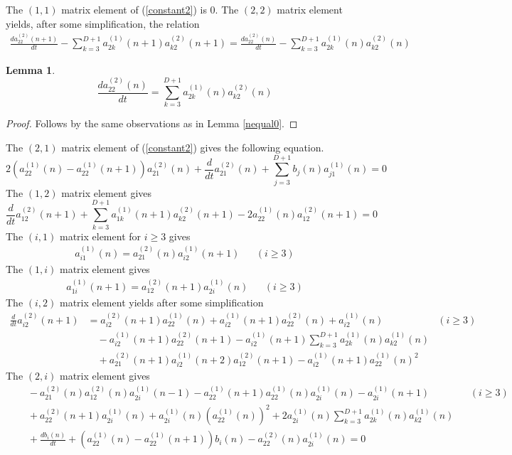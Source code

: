 \documentclass[12pt]{article}
\newtheorem{lemma}[theorem]{Lemma}
\theoremstyle{definition}
\begin{document}
The $(1,1)$ matrix element of (\ref{constant2}) is $0$. The $(2,2)$ matrix element yields, after some simplification, the relation 
\begin{align*}
\frac{da_{22}^{(2)}(n+1)}{dt} - \sum_{k=3}^{D+1} a_{2k}^{(1)}(n+1)a_{k2}^{(2)}(n+1) = \frac{d a_{22}^{(2)}(n)}{dt}  - \sum_{k=3}^{D+1} a_{2k}^{(1)}(n)a_{k2}^{(2)}(n)
\end{align*}
\begin{lemma}
$$\frac{d a_{22}^{(2)}(n)}{dt} = \sum_{k=3}^{D+1} a_{2k}^{(1)}(n)a_{k2}^{(2)}(n)$$
\end{lemma}
\begin{proof}
Follows by the same observations as in Lemma \ref{nequal0}.
\end{proof}
The $(2,1)$ matrix element of (\ref{constant2}) gives the following equation.
\begin{equation}\label{constant21}
 2 (a_{22}^{(1)}(n) - a_{22}^{(1)}(n+1) )a_{21}^{(2)}(n) + \frac{d}{dt} a_{21}^{(2)}(n)
+ \sum_{j=3}^{D+1} b_j(n) a_{j1}^{(1)}(n) = 0
\end{equation}
The $(1,2)$ matrix element gives
\begin{equation}\label{constant12}
  \frac{d}{dt} a_{12}^{(2)}(n+1)+\sum_{k=3}^{D+1} a_{1k}^{(1)}(n+1)a_{k2}^{(2)}(n+1) - 2 a_{22}^{(1)}(n) a_{12}^{(2)}(n+1)   = 0
\end{equation}
The $(i,1)$ matrix element for $i\geq 3$ gives
\begin{align}\label{identity3}
a_{i1}^{(1)}(n) = a_{21}^{(2)}(n) a_{i2}^{(1)}(n+1) & & (i \geq 3)
\end{align}
The $(1,i)$ matrix element gives
\begin{align}\label{identity4}
a_{1i}^{(1)}(n+1) = a_{12}^{(2)}(n+1) a_{2i}^{(1)}(n) & & (i \geq 3)
\end{align}
The $(i,2)$ matrix element yields after some simplification
\begin{align*}
\frac{d}{dt}a_{i2}^{(2)}(n+1) &=  a_{i2}^{(2)}(n+1) a_{22}^{(1)}(n) + a_{i2}^{(1)}(n+1)a_{22}^{(2)}(n) + a_{i2}^{(1)}(n) & (i \geq 3) \\
&\quad - a_{i2}^{(1)}(n+1) a_{22}^{(2)}(n+1) - a_{i2}^{(1)}(n+1) \sum_{k=3}^{D+1} a_{2k}^{(1)}(n) a_{k2}^{(1)}(n) \\
&\quad +  a_{21}^{(2)}(n+1) a_{i2}^{(1)}(n+2) a_{12}^{(2)}(n+1) -  a_{i2}^{(1)}(n+1) a_{22}^{(1)}(n)^2
\end{align*}
The $(2,i)$ matrix element gives
\begin{align*}
&\quad -a^{(2)}_{21}(n) a_{12}^{(2)}(n) a_{2i}^{(1)}(n-1) - a_{22}^{(1)}(n+1) a_{22}^{(1)}(n) a_{2i}^{(1)}(n)  - a_{2i}^{(1)}(n+1) & & (i \geq 3) \\
&\quad +a_{22}^{(2)}(n+1)a_{2i}^{(1)}(n) +a_{2i}^{(1)}(n) \left( a_{22}^{(1)}(n) \right)^2 + 2 a_{2i}^{(1)}(n) \sum_{k=3}^{D+1}a_{2k}^{(1)}(n) a_{k2}^{(1)}(n) \\
&\quad + \frac{d b_i(n)}{dt} +  (a_{22}^{(1)}(n) -  a_{22}^{(1)}(n+1)) b_i(n) - a_{22}^{(2)}(n) a_{2i}^{(1)}(n) = 0
\end{align*}
\end{document}
